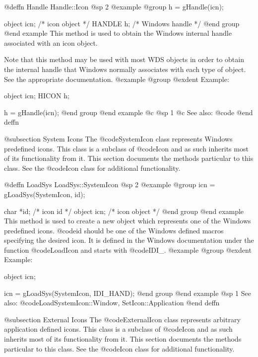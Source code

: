 @deffn {Handle} Handle::Icon
@sp 2
@example
@group
h = gHandle(icn);

object  icn;    /*  icon object     */
HANDLE  h;      /*  Windows handle  */
@end group
@end example
This method is used to obtain the Windows internal handle associated with
an icon object.  

Note that this method may be used with most WDS objects in order to obtain
the internal handle that Windows normally associates with each type of object.
See the appropriate documentation.
@example
@group
@exdent Example:

object  icn;
HICON   h;

h = gHandle(icn);
@end group
@end example
@c @sp 1
@c See also:  @code{}
@end deffn









@subsection System Icons
The @code{SystemIcon} class represents Windows predefined icons.
This class is a subclass of @code{Icon} and as such inherits most
of its functionality from it.  This section documents the methods
particular to this class.  See the @code{Icon} class for additional
functionality.











@deffn {LoadSys} LoadSys::SystemIcon
@sp 2
@example
@group
icn = gLoadSys(SystemIcon, id);

char    *id;    /*  icon id      */
object  icn;    /*  icon object  */
@end group
@end example
This method is used to create a new object which represents one of the
Windows predefined icons.  @code{id} should be one of the Windows
defined macros specifying the desired icon.  It is defined in the
Windows documentation under the function @code{LoadIcon} and
starts with @code{IDI_}.
@example
@group
@exdent Example:

object  icn;

icn = gLoadSys(SystemIcon, IDI_HAND);
@end group
@end example
@sp 1
See also:  @code{LoadSystemIcon::Window, SetIcon::Application}
@end deffn





@subsection External Icons
The @code{ExternalIcon} class represents arbitrary application defined
icons.  This class is a subclass of @code{Icon} and as such inherits
most of its functionality from it.  This section documents the methods
particular to this class.  See the @code{Icon} class for additional
functionality.






